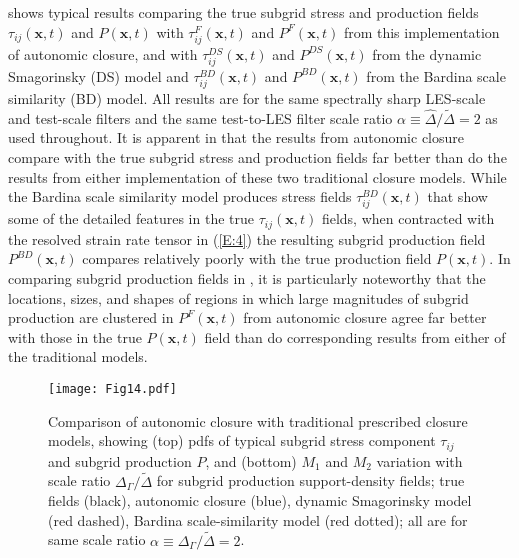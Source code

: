 \clearpage

 shows typical results comparing the true subgrid stress and production fields $\tau_{ij}(\mathbf{x},t)$  and  $P(\mathbf{x},t)$ with  $\tau_{ij}^{F}(\mathbf{x},t)$  and  $P^{F}(\mathbf{x},t)$   from this implementation of autonomic closure, and with  $\tau_{ij}^{DS}(\mathbf{x},t)$  and  $P^{DS}(\mathbf{x},t)$   from the dynamic Smagorinsky (DS) model and   $\tau_{ij}^{BD}(\mathbf{x},t)$  and  $P^{BD}(\mathbf{x},t)$  from the Bardina scale similarity (BD) model. All results are for the same spectrally sharp LES-scale and test-scale filters and the same test-to-LES filter scale ratio $\alpha \equiv \widehat{\Delta}/ \widetilde{\Delta} = 2$  as used throughout. It is apparent in  that the results from autonomic closure compare with the true subgrid stress and production fields far better than do the results from either implementation of these two traditional closure models. While the Bardina scale similarity model produces stress fields  $\tau_{ij}^{BD}(\mathbf{x},t)$  that show some of the detailed features in the true $\tau_{ij}(\mathbf{x},t)$ fields, when contracted with the resolved strain rate tensor in (\ref{E:4}) the resulting subgrid production field $P^{BD}(\mathbf{x},t)$ compares relatively poorly with the true production field $P(\mathbf{x},t)$. In comparing subgrid production fields in , it is particularly noteworthy that the locations, sizes, and shapes of regions in which large magnitudes of subgrid production are clustered in $P^{F}(\mathbf{x},t)$  from autonomic closure agree far better with those in the true  $P(\mathbf{x},t)$ field than do corresponding results from either of the traditional models. 

%
\begin{figure}
	\centering \hspace{-1.0cm}
	\texttt{[image: Fig14.pdf]}
	\caption{ Comparison of autonomic closure with traditional prescribed closure models, showing (top) pdfs of typical subgrid stress component $\tau_{ij}$ and subgrid production $P$, and (bottom) $M_1$ and $M_2$ variation with scale ratio $\Delta_{\Gamma} / \widetilde{\Delta}$ for subgrid production support-density fields; true fields (black), autonomic closure (blue), dynamic Smagorinsky model (red dashed), Bardina scale-similarity model (red dotted); all are for same scale ratio $\alpha \equiv \Delta_{\Gamma} / \widetilde{\Delta} = 2$.}
	\label{F:14}
\end{figure}
%
%

